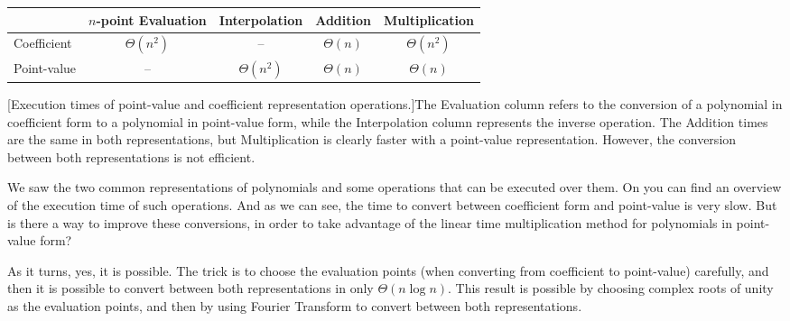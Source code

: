 \begin{center}
  \begin{tabular}[htb]{l|c|c||c|c|}
    \cline{2-5}
     &$n$-point Evaluation & Interpolation & Addition & Multiplication\\ \hline
    \multicolumn{1}{|l|}{Coefficient} &
      $\Theta(n^2)$  &  --  &  $\Theta(n)$  &  $\Theta(n^2)$          \\ \hline
    \multicolumn{1}{|l|}{Point-value} &
      --  &  $\Theta(n^2)$  &  $\Theta(n)$  &  $\Theta(n)$            \\ \hline
  \end{tabular}
  [Execution times of point-value and coefficient
  representation operations.]{The Evaluation column refers to the conversion of
    a polynomial in coefficient form to a polynomial in point-value form, while
    the Interpolation column represents the inverse operation. The Addition
    times are the same in both representations, but Multiplication is clearly
    faster with a point-value representation. However, the conversion between
    both representations is not efficient.  \label{tab:poly-reps}}
\end{center}

We saw the two common representations of polynomials and some operations that
can be executed over them. On  you can find an overview
of the execution time of such operations. And as we can see, the time to
convert between coefficient form and point-value is very slow. But is there
a way to improve these conversions, in order to take advantage of the linear
time multiplication method for polynomials in point-value form?

As it turns, yes, it is possible. The trick is to choose the evaluation points
(when converting from coefficient to point-value) carefully, and then it is
possible to convert between both representations in only $\Theta(n \log{n})$.
This result is possible by choosing complex roots of unity as the evaluation
points, and then by using Fourier Transform to convert between both
representations.

